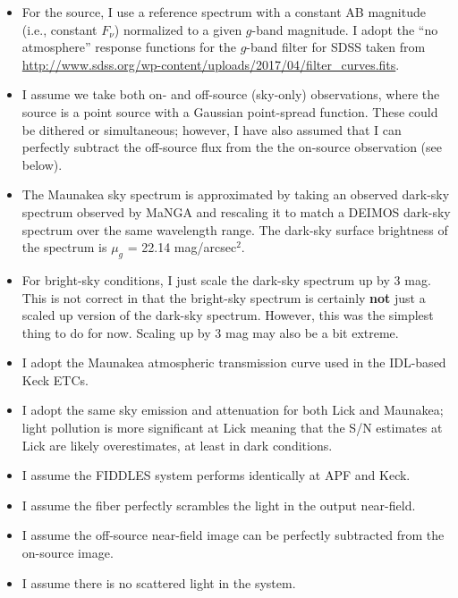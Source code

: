 \documentclass[onecolumn,floatfix,tighten]{aastex62}
\begin{document}
\begin{itemize}

\item For the source, I use a reference spectrum with a constant AB
magnitude (i.e., constant $F_\nu$) normalized to a given $g$-band
magnitude. I adopt the ``no atmosphere'' response functions for the
$g$-band filter for SDSS taken from
\url{http://www.sdss.org/wp-content/uploads/2017/04/filter_curves.fits}.

\item I assume we take both on- and off-source (sky-only)
observations, where the source is a point source with a Gaussian
point-spread function. These could be dithered or simultaneous;
however, I have also assumed that I can perfectly subtract the
off-source flux from the the on-source observation (see below).

\item The Maunakea sky spectrum is approximated by taking an observed
dark-sky spectrum observed by MaNGA and rescaling it to match a
DEIMOS dark-sky spectrum over the same wavelength range. The dark-sky
surface brightness of the spectrum is $\mu_g$ = 22.14 mag/arcsec$^2$.

\item For bright-sky conditions, I just scale the dark-sky spectrum
up by 3 mag. This is not correct in that the bright-sky spectrum is
certainly {\bf not} just a scaled up version of the dark-sky
spectrum. However, this was the simplest thing to do for now. Scaling
up by 3 mag may also be a bit extreme.

\item I adopt the Maunakea atmospheric transmission curve used in the
IDL-based Keck ETCs.

\item I adopt the same sky emission and attenuation for both Lick and
Maunakea; light pollution is more significant at Lick meaning that
the S/N estimates at Lick are likely overestimates, at least in dark
conditions.

\item I assume the FIDDLES system performs identically at APF and
Keck.

\item I assume the fiber perfectly scrambles the light in the output
near-field.

\item I assume the off-source near-field image can be perfectly
subtracted from the on-source image.

\item I assume there is no scattered light in the system.


\end{itemize}
\end{document}

